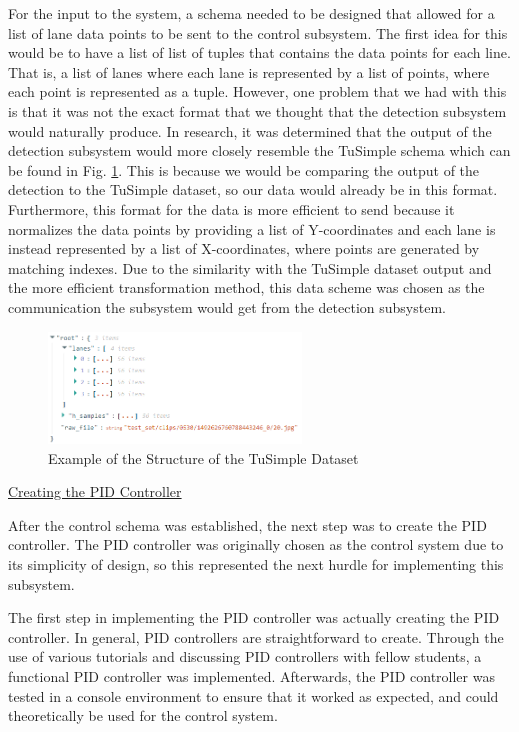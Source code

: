 \documentclass[titlepage,draft]{article}
\begin{document}
{For the input to the system, a schema needed to be designed that allowed for a list of lane data points to be sent to the control subsystem. The first idea for this would be to have a list of list of tuples that contains the data points for each line. That is, a list of lanes where each lane is represented by a list of points, where each point is represented as a tuple. However, one problem that we had with this is that it was not the exact format that we thought that the detection subsystem would naturally produce. In research, it was determined that the output of the detection subsystem would more closely resemble the TuSimple schema which can be found in Fig. \ref{fig:tusimple_dataformat}. This is because we would be comparing the output of the detection to the TuSimple dataset, so our data would already be in this format. Furthermore, this format for the data is more efficient to send because it normalizes the data points by providing a list of Y-coordinates and each lane is instead represented by a list of X-coordinates, where points are generated by matching indexes. Due to the similarity with the TuSimple dataset output and the more efficient transformation method, this data scheme was chosen as the communication the subsystem would get from the detection subsystem.

\begin{figure}
	\centering
	\includegraphics[width=0.6\textwidth]{tusimple_data_example}
	\caption{Example of the Structure of the TuSimple Dataset}
	\label{fig:tusimple_dataformat}
\end{figure}

\underline{Creating the PID Controller}

After the control schema was established, the next step was to create the PID controller. The PID controller was originally chosen as the control system due to its simplicity of design, so this represented the next hurdle for implementing this subsystem.

The first step in implementing the PID controller was actually creating the PID controller. In general, PID controllers are straightforward to create. Through the use of various tutorials and discussing PID controllers with fellow students, a functional PID controller was implemented. Afterwards, the PID controller was tested in a console environment to ensure that it worked as expected, and could theoretically be used for the control system.

}
\end{document}

